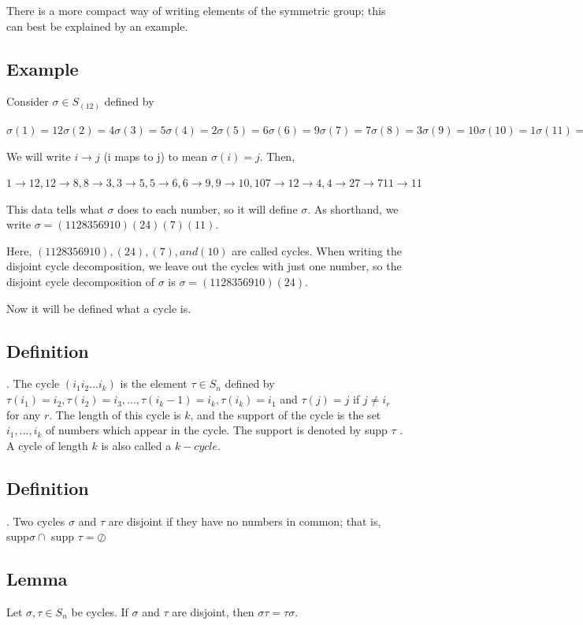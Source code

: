 There is a more compact way of writing elements of the symmetric group; this can best be explained by an
example.

\subsection{Example} Consider $\sigma \in S_(12)$ defined by

	$\sigma(1) = 12 \sigma(2) = 4 \sigma(3) = 5 \sigma(4) = 2 \sigma(5) = 6 \sigma(6) = 9
	\sigma(7) = 7 \sigma(8) = 3 \sigma(9) = 10 \sigma(10) = 1 \sigma(11) = 11 \sigma(12) = 8$

We will write $i \rightarrow j$ (i maps to j) to mean $\sigma(i) = j$. Then,

	$1 \rightarrow 12, 12 \rightarrow 8, 8 \rightarrow 3, 3 \rightarrow 5, 5 \rightarrow 6, 6 \rightarrow 9, 9 \rightarrow 10, 10 7\rightarrow 1
	2 \rightarrow 4, 4 \rightarrow 2
	7 \rightarrow 7
	11 \rightarrow 11$


This data tells what $\sigma$ does to each number, so it will define $\sigma$. As shorthand, we write
$\sigma = (1 12 8 3 5 6 9 10) (2 4) (7) (11).$

Here, $(1 12 8 3 5 6 9 10), (2 4), (7), and (10)$ are called cycles. When writing the disjoint cycle decomposition,
we leave out the cycles with just one number, so the disjoint cycle decomposition of $\sigma$ is
$\sigma = (1 12 8 3 5 6 9 10) (2 4).$ 

Now it will be defined what a cycle is.

\subsection{Definition}. The cycle $(i_1  i_2 ... i_k )$ is the element $\tau \in S_n$ defined by $\tau(i_1 ) = i_2 , \tau(i_2 ) = i_3 , . . . , \tau(i_k  -1) =
i_k , \tau(i_k ) = i_1 $ and $\tau(j) = j$ if $j \neq i_r $ for any $r$. The length of this cycle is $k$, and the support of the cycle
is the set ${i_1 , . . . , i_k }$ of numbers which appear in the cycle. The support is denoted by supp $\tau$ . A cycle of
length $k$ is also called a $k-cycle$.

\subsection{Definition}. Two cycles $\sigma$ and $\tau$ are disjoint if they have no numbers in common; that is, supp$\sigma \cap$ 
supp $\tau = \oslash$

\subsection{Lemma} Let $\sigma,\tau\in S_n$ be cycles. If $\sigma$ and $\tau$ are disjoint, then $\sigma\tau = \tau\sigma$.

